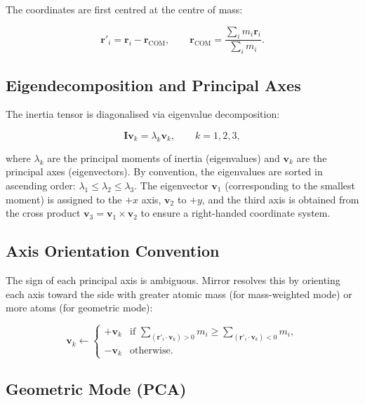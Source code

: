 \documentclass[11pt,a4paper]{article}
\newcommand{\vect}[1]{\bm{#1}}
\begin{document}
The coordinates are first centred at the centre of mass:

\begin{equation}
\vect{r}'_i = \vect{r}_i - \vect{r}_{\text{COM}},
\qquad
\vect{r}_{\text{COM}} = \frac{\sum_i m_i \vect{r}_i}{\sum_i m_i}.
\end{equation}

\subsection{Eigendecomposition and Principal Axes}

The inertia tensor is diagonalised via eigenvalue decomposition:

\begin{equation}
\vect{I} \vect{v}_k = \lambda_k \vect{v}_k,
\qquad k = 1, 2, 3,
\end{equation}

where $\lambda_k$ are the principal moments of inertia (eigenvalues) and
$\vect{v}_k$ are the principal axes (eigenvectors).  By convention, the
eigenvalues are sorted in ascending order: $\lambda_1 \le \lambda_2 \le
\lambda_3$.  The eigenvector $\vect{v}_1$ (corresponding to the smallest
moment) is assigned to the $+x$ axis, $\vect{v}_2$ to $+y$, and the
third axis is obtained from the cross product $\vect{v}_3 =
\vect{v}_1 \times \vect{v}_2$ to ensure a right-handed coordinate
system.

\subsection{Axis Orientation Convention}

The sign of each principal axis is ambiguous.  Mirror resolves this by
orienting each axis toward the side with greater atomic mass (for
mass-weighted mode) or more atoms (for geometric mode):

\begin{equation}
\vect{v}_k \leftarrow \begin{cases}
+\vect{v}_k & \text{if } \sum_{(\vect{r}'_i \cdot \vect{v}_k) > 0} m_i
               \ge \sum_{(\vect{r}'_i \cdot \vect{v}_k) < 0} m_i, \\
-\vect{v}_k & \text{otherwise}.
\end{cases}
\end{equation}

\subsection{Geometric Mode (PCA)}
\end{document}
